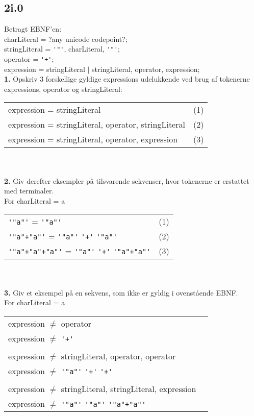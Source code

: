 \subsection{2i.0}

Betragt EBNF’en:\\

charLiteral = ?any unicode codepoint?;\\
stringLiteral = \verb|'"'|, {charLiteral}, \verb|'"'|;\\
operator = \verb|'+'|;\\
expression = stringLiteral $|$ stringLiteral, operator, expression; \\

\textbf{1.} Opskriv 3 forskellige gyldige expressions udelukkende ved brug af tokenerne
expressions, operator og stringLiteral:\\

\begin{tabular}{lp{10cm}}
	expression = stringLiteral & (1) \\
	expression = stringLiteral, operator, stringLiteral & (2)\\
	expression = stringLiteral, operator, expression & (3)
\end{tabular}\\\\


\textbf{2.} Giv derefter eksempler på tilsvarende sekvenser, hvor tokenerne er erstattet med terminaler.\\

For charLiteral = a \\

\begin{tabular}{lp{10cm}}
	\verb|'"a"'| = \verb|'"a"'| & (1) \\
	\verb|'"a"+"a"'| = \verb|'"a"'| \verb|'+'| \verb|'"a"'| & (2)\\
	\verb|'"a"+"a"+"a"'| = \verb|'"a"'| \verb|'+'| \verb|'"a"+"a"'| & (3)
\end{tabular}\\\\

\textbf{3.} Giv et eksempel på en sekvens, som ikke er gyldig i ovenstående EBNF.\\

For charLiteral = a \\

\begin{tabular}{lp{10cm}}
	expression $\neq$ operator \\
	expression $\neq$ \verb|'+'| \\\\
	expression $\neq$ stringLiteral, operator, operator \\
	expression $\neq$ \verb|'"a"'| \verb|'+'| \verb|'+'| \\\\
	expression $\neq$ stringLiteral, stringLiteral, expression \\
	expression $\neq$ \verb|'"a"'| \verb|'"a"'| \verb|'"a"+"a"'| 
\end{tabular}\\


